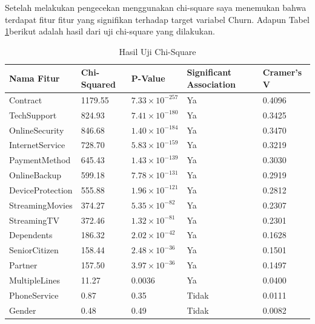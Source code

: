 
Setelah melakukan pengecekan menggunakan chi-square saya menemukan bahwa terdapat fitur fitur yang signifikan terhadap target variabel Churn. Adapun Tabel \ref{tabel_uji}berikut adalah hasil dari uji chi-square yang dilakukan.

\begin{table}[H]
    \centering
    \caption{Hasil Uji Chi-Square}
    \label{tabel_uji}
    \begin{tabular}{|l|l|l|l|l|}
        \hline
        \textbf{Nama Fitur} & \textbf{Chi-Squared} & \textbf{P-Value} & \textbf{Significant Association} & \textbf{Cramer's V} \\ \hline
        Contract & 1179.55 & $7.33 \times 10^{-257}$ & Ya & 0.4096 \\ \hline
        TechSupport & 824.93 & $7.41 \times 10^{-180}$ & Ya & 0.3425 \\ \hline
        OnlineSecurity & 846.68 & $1.40 \times 10^{-184}$ & Ya & 0.3470 \\ \hline
        InternetService & 728.70 & $5.83 \times 10^{-159}$ & Ya & 0.3219 \\ \hline
        PaymentMethod & 645.43 & $1.43 \times 10^{-139}$ & Ya & 0.3030 \\ \hline
        OnlineBackup & 599.18 & $7.78 \times 10^{-131}$ & Ya & 0.2919 \\ \hline
        DeviceProtection & 555.88 & $1.96 \times 10^{-121}$ & Ya & 0.2812 \\ \hline
        StreamingMovies & 374.27 & $5.35 \times 10^{-82}$ & Ya & 0.2307 \\ \hline
        StreamingTV & 372.46 & $1.32 \times 10^{-81}$ & Ya & 0.2301 \\ \hline
        Dependents & 186.32 & $2.02 \times 10^{-42}$ & Ya & 0.1628 \\ \hline
        SeniorCitizen & 158.44 & $2.48 \times 10^{-36}$ & Ya & 0.1501 \\ \hline
        Partner & 157.50 & $3.97 \times 10^{-36}$ & Ya & 0.1497 \\ \hline
        MultipleLines & 11.27 & 0.0036 & Ya & 0.0400 \\ \hline
        PhoneService & 0.87 & 0.35 & Tidak & 0.0111 \\ \hline
        Gender & 0.48 & 0.49 & Tidak & 0.0082 \\ \hline

    \end{tabular}
\end{table}

